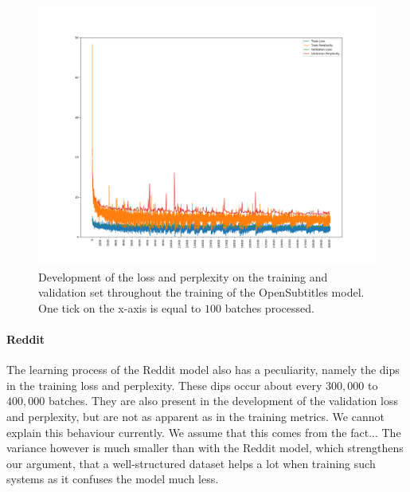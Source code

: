 \begin{figure}[H]
	\includegraphics[width=\linewidth]{img/plots/opensubtitles_not_reversed/train_metrics.png}
	\caption{Development of the loss and perplexity on the training and validation set throughout the training of the OpenSubtitles model. One tick on the x-axis is equal to $100$ batches processed.}
	\label{results:learning_process:metrics:opensubtitles}
\end{figure}

\paragraph{Reddit} The learning process of the Reddit model also has a peculiarity, namely the dips in the training loss and perplexity. These dips occur about every $300,000$ to $400,000$ batches. They are also present in the development of the validation loss and perplexity, but are not as apparent as in the training metrics. We cannot explain this behaviour currently. We assume that this comes from the fact... The variance however is much smaller than with the Reddit model, which strengthens our argument, that a well-structured dataset helps a lot when training such systems as it confuses the model much less.

